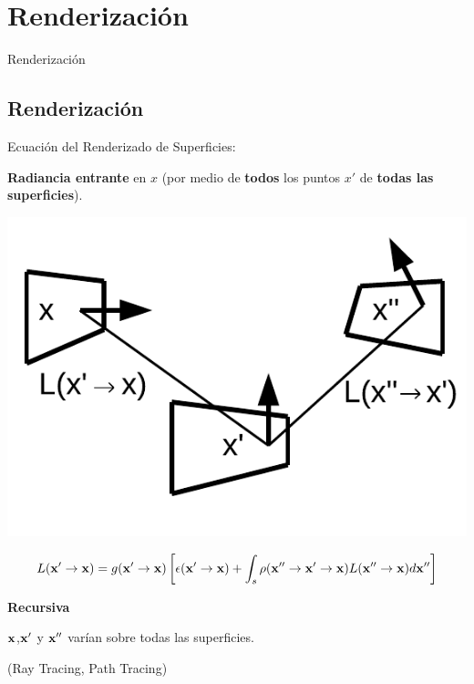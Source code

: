 \documentclass[spanish,unknownkeysallowed,10pt]{beamer}
\begin{document}
\section{Renderización}


\begin{frame}
\begin{block}{}
\begin{center}
\vspace{1cm}
\huge{Renderización}
\vspace{1cm}
\end{center}
\end{block}
\end{frame}


\subsection{Renderización}

\begin{frame}{Ecuación del Renderizado de Superficies:}

\textbf{Radiancia entrante} en $x$ (por medio de \textbf{todos} los puntos $x'$ de \textbf{todas las superficies}).

\centerline{\includegraphics[scale = 0.4]{../figures/rendequation}}
\vspace{-1cm}
$$ L(\bold{x'} \rightarrow \bold{x}) =  g(\bold{x'}  \rightarrow \bold{x})  \left[ \epsilon(\bold{x'}  \rightarrow \bold{x}) + \int_{s}{\rho(\bold{x''}  \rightarrow \bold{x'}  \rightarrow \bold{x})L(\bold{x''}  \rightarrow \bold{x}) d\bold{x''}} \right] $$

\textbf{Recursiva}

$\bold{x}$,$\bold{x'}$ y $\bold{x''}$ varían sobre todas las superficies.

(Ray Tracing, Path Tracing)

\end{frame}
\end{document}
